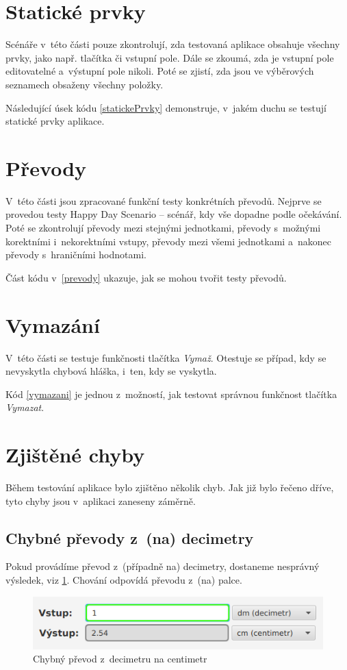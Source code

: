 	\section{Statické prvky}
	Scénáře v~této části pouze zkontrolují, zda testovaná aplikace obsahuje všechny prvky, jako např. tlačítka či vstupní pole. Dále se zkoumá, zda je vstupní pole editovatelné a~výstupní pole nikoli. Poté se zjistí, zda jsou ve výběrových seznamech obsaženy všechny položky.
	
	Následující úsek kódu \ref{statickePrvky} demonstruje, v~jakém duchu se testují statické prvky aplikace.
	
	
	\section{Převody}
	V~této části jsou zpracované funkční testy konkrétních převodů. Nejprve se provedou testy Happy Day Scenario -- scénář, kdy vše dopadne podle očekávání. Poté se zkontrolují převody mezi stejnými jednotkami, převody s~možnými korektními i~nekorektními vstupy, převody mezi všemi jednotkami a~nakonec převody s~hraničními hodnotami.
	
	Část kódu v~\ref{prevody} ukazuje, jak se mohou tvořit testy převodů.
	
	
	\section{Vymazání}
	V~této části se testuje funkčnosti tlačítka \emph{Vymaž}. Otestuje se případ, kdy se nevyskytla chybová hláška, i~ten, kdy se vyskytla.
	
	Kód \ref{vymazani} je jednou z~možností, jak testovat správnou funkčnost tlačítka \emph{Vymazat}.
	
	
	\section{Zjištěné chyby}
	Během testování aplikace bylo zjištěno několik chyb. Jak již bylo řečeno dříve, tyto chyby jsou v~aplikaci zaneseny záměrně.
	
		\subsection{Chybné převody z~(na) decimetry}
		Pokud provádíme převod z~(případně na) decimetry, dostaneme nesprávný výsledek, viz \ref{ChybaDm}. Chování odpovídá převodu z~(na) palce.
			\begin{figure}[ht!]
				\centering
				\caption{Chybný převod z~decimetru na centimetr}
				\label{ChybaDm}
				\includegraphics[width=13.5cm]{img/Chyby/Dm.png}
			\end{figure}
			\FloatBarrier
		
